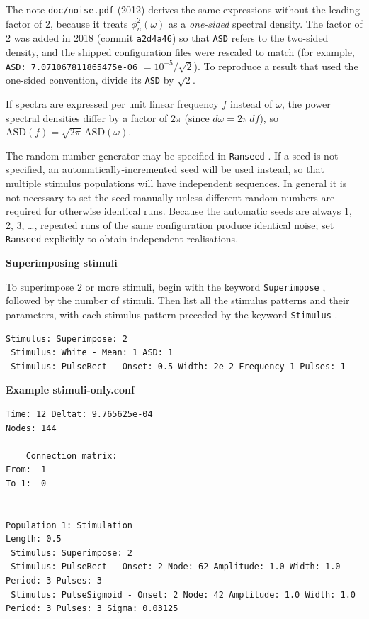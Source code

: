 \documentclass[12pt,a4paper]{article}
\newcommand{\type}[1]{{\small\small\tt #1} }
\begin{document}
\begin{description}
\begin{itemize}
    The note \texttt{doc/noise.pdf} (2012) derives the same expressions without the leading factor of 2, because it treats \(\phi_n^2(\omega)\) as a \emph{one-sided} spectral density.
    The factor of 2 was added in 2018 (commit \texttt{a2d4a46}) so that \type{ASD} refers to the two-sided density, and the shipped configuration files were rescaled to match (for example, \texttt{ASD: 7.071067811865475e-06} \(= 10^{-5}/\sqrt{2}\)).
    To reproduce a result that used the one-sided convention, divide its \type{ASD} by \(\sqrt{2}\).

    If spectra are expressed per unit linear frequency \(f\) instead of \(\omega\), the power spectral densities differ by a factor of \(2\pi\) (since \(d\omega = 2\pi\,df\)), so \(\mathrm{ASD}(f) = \sqrt{2\pi}\,\mathrm{ASD}(\omega)\).

    The random number generator may be specified in \type{Ranseed}. If a seed is not specified, an automatically-incremented seed will be used instead, so that multiple stimulus populations will have independent sequences. In general it is not necessary to set the seed manually unless different random numbers are required for otherwise identical runs.
    Because the automatic seeds are always 1, 2, 3, \ldots, repeated runs of the same configuration produce identical noise; set \type{Ranseed} explicitly to obtain independent realisations.

    \vspace{5mm}
    \textbf{Superimposing stimuli}

    To superimpose 2 or more stimuli, begin with the keyword \type{Superimpose}, followed by the number of stimuli. Then list all the stimulus patterns and their parameters, with each stimulus pattern preceded by the keyword \type{Stimulus}.
    \begin{lstlisting}
Stimulus: Superimpose: 2
 Stimulus: White - Mean: 1 ASD: 1
 Stimulus: PulseRect - Onset: 0.5 Width: 2e-2 Frequency 1 Pulses: 1
    \end{lstlisting}

    \vspace{5mm}
    \textbf{Example stimuli-only.conf}

    \begin{lstlisting}
Time: 12 Deltat: 9.765625e-04
Nodes: 144

    Connection matrix:
From:  1 
To 1:  0


Population 1: Stimulation
Length: 0.5
 Stimulus: Superimpose: 2
 Stimulus: PulseRect - Onset: 2 Node: 62 Amplitude: 1.0 Width: 1.0 Period: 3 Pulses: 3
 Stimulus: PulseSigmoid - Onset: 2 Node: 42 Amplitude: 1.0 Width: 1.0 Period: 3 Pulses: 3 Sigma: 0.03125


\end{lstlisting}
\end{itemize}
\end{description}
\end{document}
